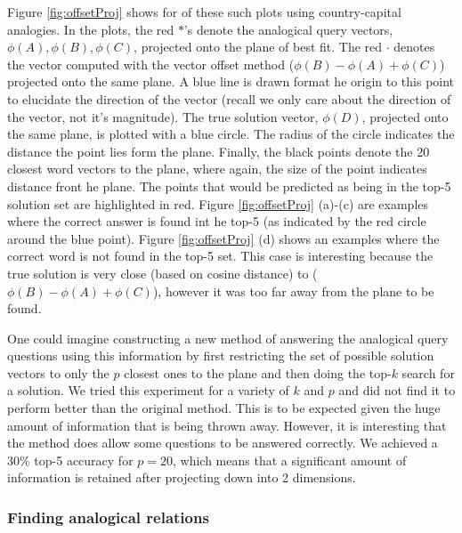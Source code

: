 Figure \ref{fig:offsetProj} shows for of these such plots using country-capital analogies. In the plots, the red $*$'s denote the analogical query vectors, $\phi(A), \phi(B), \phi(C)$, projected onto the plane of best fit. The red $\cdot$ denotes the vector computed with the vector offset method ($\phi(B) - \phi(A) + \phi(C)$) projected onto the same plane. A blue line is drawn format he origin to this point to elucidate the direction of the vector (recall we only care about the direction of the vector, not it's magnitude). The true solution vector, $\phi(D)$, projected onto the same plane, is plotted with a blue circle. The radius of the circle indicates the distance the point lies form the plane. Finally, the black points denote the 20 closest word vectors to the plane, where again, the size of the point indicates distance front he plane. The points that would be predicted as being in the top-5 solution set are highlighted in red. Figure \ref{fig:offsetProj} (a)-(c) are examples where the correct answer is found int he top-5 (as indicated by the red circle around the blue point). Figure \ref{fig:offsetProj} (d) shows an examples where the correct word is not found in the top-5 set. This case is interesting because the true solution is very close (based on cosine distance) to ($\phi(B) - \phi(A) + \phi(C)$), however it was too far away from the plane to be found. 

One could imagine constructing a new method of answering the analogical query questions using this information by first restricting the set of possible solution vectors to only the $p$ closest ones to the plane and then doing the top-$k$ search for a solution. We tried this experiment for a variety of $k$ and $p$ and did not find it to perform better than the original method. This is to be expected given the huge amount of information that is being thrown away. However, it is interesting that the method does allow some questions to be answered correctly. We achieved a 30\% top-5 accuracy for $p = 20$, which means that a significant amount of information is retained after projecting down into 2 dimensions.  

\subsubsection{Finding analogical relations}

